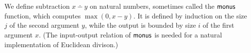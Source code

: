\newcommand{\apred}{\AgdaFunction{pred}}
\newcommand{\amonus}{\AgdaFunction{monus}}
\newcommand{\arefl}{\AgdaInductiveConstructor{refl}}
\newcommand{\azero}{\AgdaInductiveConstructor{zero}}
\newcommand{\asuc}{\AgdaInductiveConstructor{suc}}
\newcommand{\aNat}{\AgdaDatatype{Nat}}

\begin{code}%
\>[0]\AgdaSpace{}%
\AgdaSpace{}%
\AgdaSymbol{:}\AgdaSpace{}%
\AgdaSpace{}%
\AgdaSpace{}%
\AgdaSpace{}%
\<%
\\
\>[0][@{}l@{\AgdaIndent{0}}]%
\>[2]%
\>[8]\AgdaSymbol{:}%
\>[11]\AgdaSpace{}%
\AgdaSpace{}%
\AgdaSpace{}%
\AgdaSpace{}%
\AgdaSymbol{(}\AgdaSpace{}%
\AgdaFunction{+}\AgdaSpace{}%
\AgdaSymbol{)}\<%
\\
\>[0][@{}l@{\AgdaIndent{0}}]%
\>[2]%
\>[8]\AgdaSymbol{:}%
\>[11]\AgdaSpace{}%
\AgdaSpace{}%
\AgdaSpace{}%
\AgdaSpace{}%
\AgdaSpace{}%
\AgdaSpace{}%
\AgdaSpace{}%
\AgdaSymbol{(}\AgdaSpace{}%
\AgdaFunction{+}\AgdaSpace{}%
\AgdaSymbol{)}\<%
\end{code}

We define subtraction $x \dotminus y$ on natural numbers, sometimes called the $\amonus$ function, which computes $\max(0, x-y)$.  It is defined by induction on the size $j$ of the second argument $y$, while the output is bounded by size $i$ of the first argument $x$.  (The input-output relation of $\amonus$ is needed for a natural implementation of Euclidean divison.)

